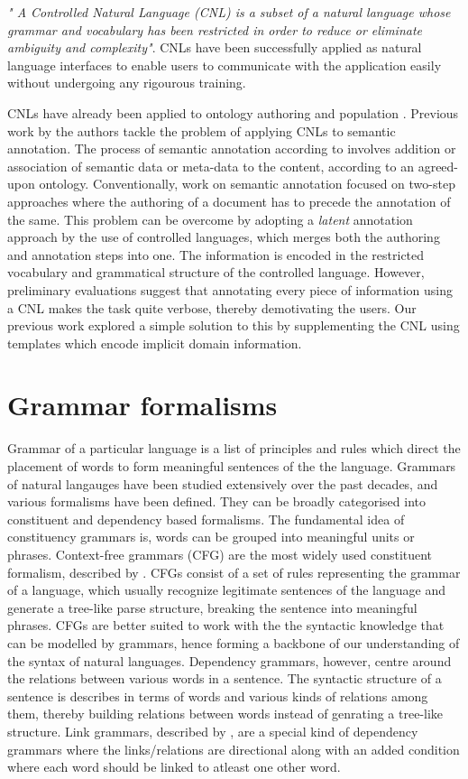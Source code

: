 \emph{ " A Controlled Natural Language (CNL) is a subset of a natural language whose grammar and vocabulary has been restricted in order to reduce or eliminate ambiguity and complexity"}\cite{schwitter}. CNLs have been successfully applied as natural language interfaces to enable users to communicate with the application easily without undergoing any rigourous training. 

 CNLs have already been applied to ontology authoring and population \cite{Funk07}.  Previous work by the authors \cite{cnl09} tackle the problem of  applying CNLs to semantic annotation.  The process of semantic annotation according to \cite{sig2003} involves addition or association of semantic data or meta-data to the content, according to an agreed-upon ontology.  Conventionally, work on semantic annotation focused on  two-step approaches where the authoring of a document has to precede the annotation  of the same.  This problem can be overcome by adopting a \emph{latent} annotation\cite{cnl09} approach by the use of controlled languages, which merges both the authoring and annotation steps into one.  The information is encoded in the restricted vocabulary and grammatical structure of the controlled language.  However, preliminary evaluations suggest that annotating every piece of information using a CNL makes the task quite verbose, thereby demotivating the users.  Our previous work explored a simple solution to this by supplementing the CNL using templates which encode implicit domain information.  


\section{Grammar formalisms}
Grammar of a particular language is a list of principles and rules which direct the placement of words to form meaningful sentences of the the language. Grammars of natural langauges have been studied extensively over the past decades, and various formalisms have been defined. They can be broadly categorised into constituent and dependency based formalisms. The fundamental idea of constituency grammars is, words can be grouped into meaningful units or phrases. Context-free grammars (CFG) are the most widely used constituent formalism, described by \cite{Chomsky1956}. CFGs consist of a set of rules representing the grammar of a language, which usually recognize legitimate sentences of the language and generate a tree-like parse structure, breaking the sentence into meaningful phrases.  CFGs are better suited to work with the the syntactic knowledge that can be modelled by grammars, hence forming a backbone of our understanding of the syntax of natural languages. Dependency grammars, however, centre around the relations between various words in a sentence.  The syntactic structure of a sentence is describes in terms of words and various kinds of relations among them, thereby building relations between words instead of genrating a tree-like structure.  Link grammars, described by \cite{sleator1995parsing}, are a special kind of dependency grammars where the links/relations are directional along with an added condition where each word should be linked to atleast one other word.
  
